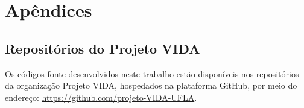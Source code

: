 \documentclass[a4paper]{ifacconf}
\begin{document}
\clearpage %











\let\oldthebibliography\thebibliography
\renewcommand{\thebibliography}[1]{\oldthebibliography{#1}\phantomsection\pdfbookmark[1]{Referências}{referencias}}


\section*{Apêndices}
{} %
\appendix
\makeatletter
\renewcommand{\thesubsection}{\Alph{subsection}}
\def\lb@subsection{\appendixname\ \thesubsection\ --\ }
\makeatother
\setcounter{subsection}{0}

\subsection{Repositórios do Projeto VIDA}
\label{ap:repositorios}

Os códigos-fonte desenvolvidos neste trabalho estão disponíveis nos repositórios da organização Projeto VIDA, hospedados na plataforma GitHub, por meio do endereço: \url{https://github.com/projeto-VIDA-UFLA}.
\end{document}
